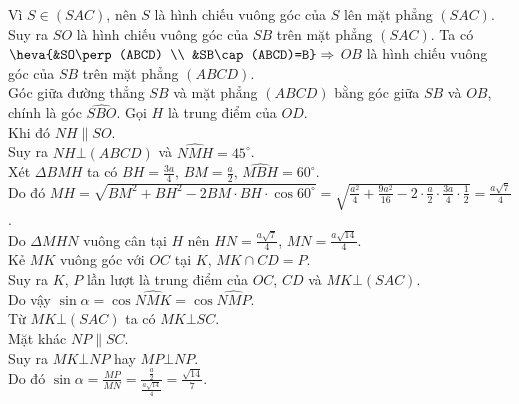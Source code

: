 \begin{ex}
{\begin{itemchoice}
			Vì $S\in (SAC)$, nên $S$ là hình chiếu vuông  góc của $S$ lên mặt phẳng $(SAC)$. \\
			 Suy ra $SO$ là hình chiếu vuông góc của $SB$ trên mặt phẳng $(SAC)$.
			 \itemch
			Ta có $\heva{&SO\perp (ABCD)  \\
			&SB\cap (ABCD)=B} \Rightarrow$ $OB$ là hình chiếu vuông góc  của $SB$ trên mặt phẳng $(ABCD)$. \\
			Góc giữa đường thẳng $SB$ và mặt phẳng  $(ABCD)$ bằng góc giữa $SB$ và $OB$, chính là góc $\widehat{SBO}$.
			\itemch 
			Gọi  $H$ là trung điểm của $OD$. \\
			Khi đó $NH \parallel SO$.  \\
			Suy ra $NH \bot (ABCD)$ và $\widehat{NMH}  = 45^{\circ}$. \\
			 Xét $\Delta BMH$ ta có $BH = \frac{3a}{4}$, $BM = \frac{a}{2}$, $\widehat{MBH} = 60^{\circ}$. \\
			Do đó $MH = \sqrt{BM^2 + BH^2 - 2BM \cdot BH \cdot \cos 60^{\circ}} = \sqrt{\frac{a^2}{4} + \frac{9a^2}{16} - 2 \cdot  \frac{a}{2} \cdot \frac{3a}{4} \cdot \frac{1}{2}} = \frac{a\sqrt{7}}{4}$. \\
			Do  $\Delta MHN$ vuông cân tại $H$ nên $HN = \frac{a\sqrt{7}}{4}$, $MN = \frac{a\sqrt{14}}{4}$. \\
			Kẻ $MK$ vuông góc với  $OC$ tại $K$, $MK \cap CD = P$. \\
			Suy ra $K$, $P$ lần lượt là trung  điểm của $OC$, $CD$ và $MK \bot (SAC)$. \\
			Do vậy $\sin \alpha = \cos \widehat{NMK} = \cos  \widehat{NMP}$. \\
			Từ $MK \bot (SAC)$ ta có  $MK \bot SC$. \\
			Mặt khác $NP \parallel SC$. \\ 
			Suy ra $MK \bot NP$ hay $MP \bot NP$.  \\
			Do đó $\sin  \alpha = \frac{MP}{MN} = \frac{\frac{a}{2}}{\frac{a\sqrt{14}}{4}} = \frac{\sqrt{14}}{7}$. \\
		\end{itemchoice}
	 }
\end{ex}

